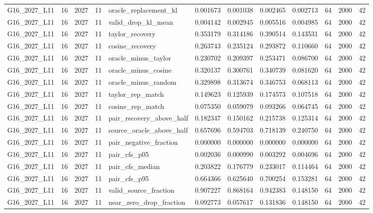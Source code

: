 \begin{tabular}{lrlrlrrrrrrr}
G16_2027_L11 & 16 & 2027 & 11 & oracle_replacement_kl & 0.001673 & 0.001038 & 0.002465 & 0.002713 & 64 & 2000 & 42 \\
G16_2027_L11 & 16 & 2027 & 11 & valid_drop_kl_mean & 0.004142 & 0.002945 & 0.005516 & 0.004985 & 64 & 2000 & 42 \\
G16_2027_L11 & 16 & 2027 & 11 & taylor_recovery & 0.353179 & 0.314186 & 0.390514 & 0.143531 & 64 & 2000 & 42 \\
G16_2027_L11 & 16 & 2027 & 11 & cosine_recovery & 0.263743 & 0.235124 & 0.293872 & 0.110660 & 64 & 2000 & 42 \\
G16_2027_L11 & 16 & 2027 & 11 & oracle_minus_taylor & 0.230702 & 0.209397 & 0.253471 & 0.086700 & 64 & 2000 & 42 \\
G16_2027_L11 & 16 & 2027 & 11 & oracle_minus_cosine & 0.320137 & 0.300761 & 0.340739 & 0.081620 & 64 & 2000 & 42 \\
G16_2027_L11 & 16 & 2027 & 11 & oracle_minus_random & 0.329898 & 0.313674 & 0.346753 & 0.068113 & 64 & 2000 & 42 \\
G16_2027_L11 & 16 & 2027 & 11 & taylor_rep_match & 0.149623 & 0.125939 & 0.174573 & 0.107518 & 64 & 2000 & 42 \\
G16_2027_L11 & 16 & 2027 & 11 & cosine_rep_match & 0.075350 & 0.059079 & 0.093266 & 0.064745 & 64 & 2000 & 42 \\
G16_2027_L11 & 16 & 2027 & 11 & pair_recovery_above_half & 0.182347 & 0.150162 & 0.215738 & 0.125314 & 64 & 2000 & 42 \\
G16_2027_L11 & 16 & 2027 & 11 & source_oracle_above_half & 0.657696 & 0.594703 & 0.718139 & 0.240750 & 64 & 2000 & 42 \\
G16_2027_L11 & 16 & 2027 & 11 & pair_negative_fraction & 0.000000 & 0.000000 & 0.000000 & 0.000000 & 64 & 2000 & 42 \\
G16_2027_L11 & 16 & 2027 & 11 & pair_cfs_p05 & 0.002036 & 0.000990 & 0.003292 & 0.004696 & 64 & 2000 & 42 \\
G16_2027_L11 & 16 & 2027 & 11 & pair_cfs_median & 0.203822 & 0.176779 & 0.233017 & 0.114464 & 64 & 2000 & 42 \\
G16_2027_L11 & 16 & 2027 & 11 & pair_cfs_p95 & 0.664366 & 0.625640 & 0.700254 & 0.153281 & 64 & 2000 & 42 \\
G16_2027_L11 & 16 & 2027 & 11 & valid_source_fraction & 0.907227 & 0.868164 & 0.942383 & 0.148150 & 64 & 2000 & 42 \\
G16_2027_L11 & 16 & 2027 & 11 & near_zero_drop_fraction & 0.092773 & 0.057617 & 0.131836 & 0.148150 & 64 & 2000 & 42 \\

\end{tabular}
